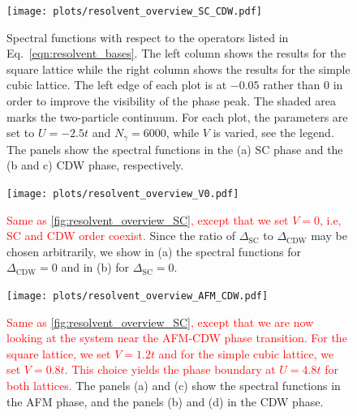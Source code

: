 \documentclass[
    reprint, 
    aps,
    preprintnumbers,
    twocolumn,
    prb,
    superscriptaddress
]{revtex4-2}
\begin{document}

\begin{figure}
    \centering
    \texttt{[image: plots/resolvent\_overview\_SC\_CDW.pdf]}
    \caption{Spectral functions with respect to the operators listed in Eq.~\eqref{eqn:resolvent_bases}.
    The left column shows the results for the square lattice while the right column shows the results for the simple cubic lattice.
    The left edge of each plot is at $-0.05$ rather than $0$ in order to improve the visibility of the phase peak.
    The shaded area marks the two-particle continuum.
    For each plot, the parameters are set to $U=-2.5t$ and $N_\gamma = 6000$, while $V$ is varied, see the legend.
    The panels show the spectral functions in the (a) SC phase and the (b and c) CDW phase, respectively.}
    \label{fig:resolvent_overview_SC}
\end{figure}

\begin{figure}
    \centering
    \texttt{[image: plots/resolvent\_overview\_V0.pdf]}
    \caption{\textcolor{red}{Same as \autoref{fig:resolvent_overview_SC}, except that we set $V=0$, i.e, SC and CDW order coexist.}
    Since the ratio of $\Delta_\text{SC}$ to $\Delta_\text{CDW}$ may be chosen arbitrarily, we show in (a) the spectral functions for $\Delta_\text{CDW} = 0$ and in (b) for $\Delta_\text{SC} = 0$.}
    \label{fig:resolvent_overview_V0}
\end{figure}

\begin{figure}
    \centering
    \texttt{[image: plots/resolvent\_overview\_AFM\_CDW.pdf]}
    \caption{\textcolor{red}{Same as \autoref{fig:resolvent_overview_SC}, except that we are now looking at the system near the AFM-CDW phase transition.
    For the square lattice, we set $V=1.2t$ and for the simple cubic lattice, we set $V=0.8t$. This choice yields the phase boundary at $U=4.8t$ for both lattices.}
    The panels (a) and (c) show the spectral functions in the AFM phase, and the panels (b) and (d) in the CDW phase.}
    \label{fig:resolvent_overview_AFM}
\end{figure}
\end{document}

